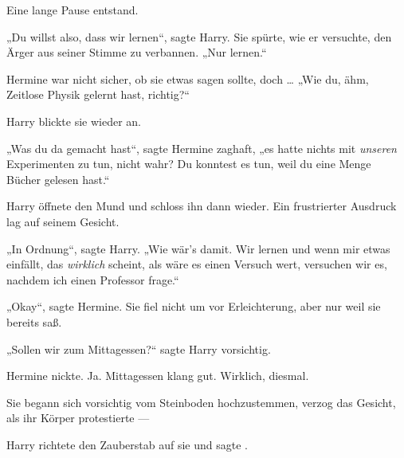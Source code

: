Eine lange Pause entstand.

„Du willst also, dass wir lernen“, sagte Harry. Sie spürte, wie er versuchte, den Ärger aus seiner Stimme zu verbannen.
„Nur lernen.“

Hermine war nicht sicher, ob sie etwas sagen sollte, doch …
„Wie du, ähm, Zeitlose Physik gelernt hast, richtig?“

Harry blickte sie wieder an.

„Was du da gemacht hast“, sagte Hermine zaghaft, „es hatte nichts mit \emph{unseren} Experimenten zu tun, nicht wahr? Du konntest es tun, weil du eine Menge Bücher gelesen hast.“

Harry öffnete den Mund und schloss ihn dann wieder. Ein frustrierter Ausdruck lag auf seinem Gesicht.

„In Ordnung“, sagte Harry.
„Wie wär’s damit. Wir lernen und wenn mir etwas einfällt, das \emph{wirklich} scheint, als wäre es einen Versuch wert, versuchen wir es, nachdem ich einen Professor frage.“

„Okay“, sagte Hermine. Sie fiel nicht um vor Erleichterung, aber nur weil sie bereits saß.

„Sollen wir zum Mittagessen?“ sagte Harry vorsichtig.

Hermine nickte. Ja. Mittagessen klang gut. Wirklich, diesmal.

Sie begann sich vorsichtig vom Steinboden hochzustemmen, verzog das Gesicht, als ihr Körper protestierte —

Harry richtete den Zauberstab auf sie und sagte .


